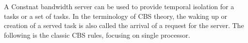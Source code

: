 %
%
A Constnat bandwidth server can be used to provide temporal isolation
for a tasks or a set of tasks. In the terminology of CBS theory, the 
waking up or creation of a served task is also called the arrival of a 
request for the server. The following is the classic CBS rules, 
focusing on single processor.
